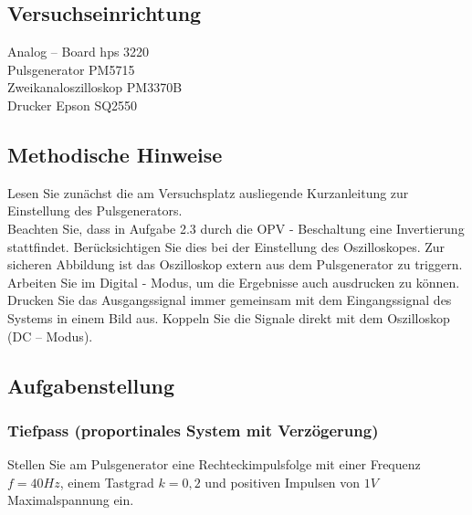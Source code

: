 \subsection{Versuchseinrichtung}

Analog – Board hps 3220 \\
Pulsgenerator PM5715 \\
Zweikanaloszilloskop PM3370B \\
Drucker Epson SQ2550\\

\subsection{Methodische Hinweise}

Lesen Sie zunächst die am Versuchsplatz ausliegende Kurzanleitung zur Einstellung des Pulsgenerators. \\
Beachten Sie, dass in Aufgabe 2.3 durch die OPV - Beschaltung eine Invertierung stattfindet. Berücksichtigen 
Sie dies bei der Einstellung des Oszilloskopes. Zur sicheren Abbildung ist das Oszilloskop extern aus dem 
Pulsgenerator zu triggern. Arbeiten Sie im Digital - Modus, um die Ergebnisse auch ausdrucken zu können. 
Drucken Sie das Ausgangssignal immer gemeinsam mit dem Eingangssignal des Systems in einem Bild aus. 
Koppeln Sie die Signale direkt mit dem Oszilloskop (DC – Modus).

\subsection{Aufgabenstellung}

\subsubsection{Tiefpass (proportinales System mit Verzögerung)}

Stellen Sie am Pulsgenerator eine Rechteckimpulsfolge mit einer Frequenz $f = 40 Hz$, einem Tastgrad 
$k = 0,2$ und positiven Impulsen von $1V$ Maximalspannung ein. 

